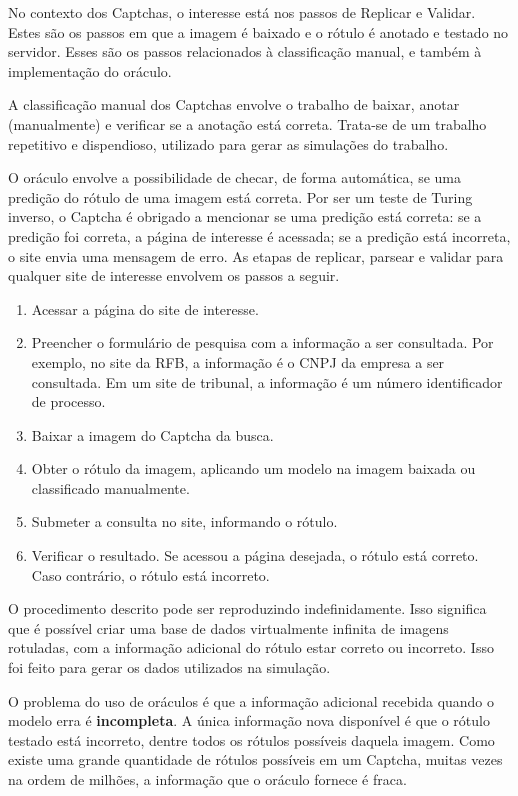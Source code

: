 \documentclass[12pt,twoside,brazilian]{book}
\providecommand{\tightlist}{%
  \setlength{\itemsep}{0pt}\setlength{\parskip}{0pt}}
\begin{document}
No contexto dos Captchas, o interesse está nos passos de Replicar e
Validar. Estes são os passos em que a imagem é baixado e o rótulo é
anotado e testado no servidor. Esses são os passos relacionados à
classificação manual, e também à implementação do oráculo.

A classificação manual dos Captchas envolve o trabalho de baixar, anotar
(manualmente) e verificar se a anotação está correta. Trata-se de um
trabalho repetitivo e dispendioso, utilizado para gerar as simulações do
trabalho.

O oráculo envolve a possibilidade de checar, de forma automática, se uma
predição do rótulo de uma imagem está correta. Por ser um teste de
Turing inverso, o Captcha é obrigado a mencionar se uma predição está
correta: se a predição foi correta, a página de interesse é acessada; se
a predição está incorreta, o site envia uma mensagem de erro. As etapas
de replicar, parsear e validar para qualquer site de interesse envolvem
os passos a seguir.

\begin{enumerate}
\def\labelenumi{\arabic{enumi}.}
\tightlist
\item
  Acessar a página do site de interesse.
\item
  Preencher o formulário de pesquisa com a informação a ser consultada.
  Por exemplo, no site da RFB, a informação é o CNPJ da empresa a ser
  consultada. Em um site de tribunal, a informação é um número
  identificador de processo.
\item
  Baixar a imagem do Captcha da busca.
\item
  Obter o rótulo da imagem, aplicando um modelo na imagem baixada ou
  classificado manualmente.
\item
  Submeter a consulta no site, informando o rótulo.
\item
  Verificar o resultado. Se acessou a página desejada, o rótulo está
  correto. Caso contrário, o rótulo está incorreto.
\end{enumerate}

O procedimento descrito pode ser reproduzindo indefinidamente. Isso
significa que é possível criar uma base de dados virtualmente infinita
de imagens rotuladas, com a informação adicional do rótulo estar correto
ou incorreto. Isso foi feito para gerar os dados utilizados na
simulação.

O problema do uso de oráculos é que a informação adicional recebida
quando o modelo erra é \textbf{incompleta}. A única informação nova
disponível é que o rótulo testado está incorreto, dentre todos os
rótulos possíveis daquela imagem. Como existe uma grande quantidade de
rótulos possíveis em um Captcha, muitas vezes na ordem de milhões, a
informação que o oráculo fornece é fraca.
\end{document}
